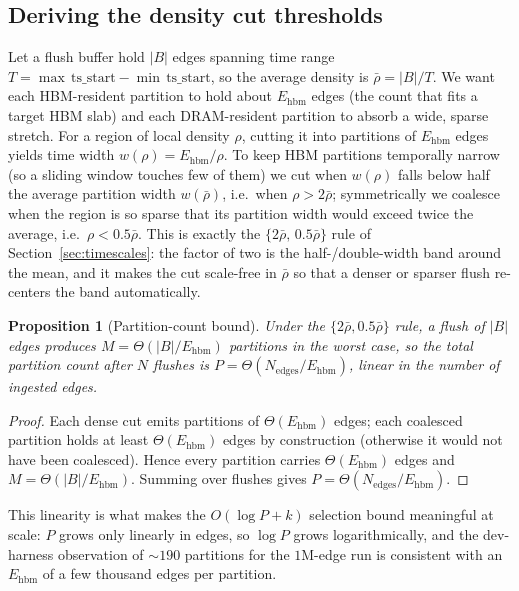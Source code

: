 \documentclass[10pt]{article}
\newtheorem{proposition}{Proposition}
\theoremstyle{definition}
\begin{document}
\subsection{Deriving the density cut thresholds}

Let a flush buffer hold $|B|$ edges spanning time range $T=\max\,\mathrm{ts\_start}-\min\,\mathrm{ts\_start}$,
so the average density is $\bar\rho=|B|/T$. We want each HBM-resident partition to hold about
$E_{\mathrm{hbm}}$ edges (the count that fits a target HBM slab) and each DRAM-resident partition to
absorb a wide, sparse stretch. For a region of local density $\rho$, cutting it into partitions of
$E_{\mathrm{hbm}}$ edges yields time width $w(\rho)=E_{\mathrm{hbm}}/\rho$. To keep HBM partitions
temporally narrow (so a sliding window touches few of them) we cut when $w(\rho)$ falls below half the
average partition width $w(\bar\rho)$, i.e.\ when $\rho>2\bar\rho$; symmetrically we coalesce when the
region is so sparse that its partition width would exceed twice the average, i.e.\ $\rho<0.5\bar\rho$.
This is exactly the $\{2\bar\rho,\,0.5\bar\rho\}$ rule of Section~\ref{sec:timescales}: the factor of
two is the half-/double-width band around the mean, and it makes the cut scale-free in $\bar\rho$ so
that a denser or sparser flush re-centers the band automatically.

\begin{proposition}[Partition-count bound]
\label{prop:pcount}
Under the $\{2\bar\rho,0.5\bar\rho\}$ rule, a flush of $|B|$ edges produces
$M=\Theta(|B|/E_{\mathrm{hbm}})$ partitions in the worst case, so the total partition count after $N$
flushes is $P=\Theta(N_{\mathrm{edges}}/E_{\mathrm{hbm}})$, linear in the number of ingested edges.
\end{proposition}
\begin{proof}
Each dense cut emits partitions of $\Theta(E_{\mathrm{hbm}})$ edges; each coalesced partition holds at
least $\Theta(E_{\mathrm{hbm}})$ edges by construction (otherwise it would not have been coalesced). Hence
every partition carries $\Theta(E_{\mathrm{hbm}})$ edges and $M=\Theta(|B|/E_{\mathrm{hbm}})$. Summing over
flushes gives $P=\Theta(N_{\mathrm{edges}}/E_{\mathrm{hbm}})$.
\end{proof}

This linearity is what makes the $O(\log P + k)$ selection bound meaningful at scale: $P$ grows only
linearly in edges, so $\log P$ grows logarithmically, and the dev-harness observation of ${\sim}190$
partitions for the $1$M-edge run is consistent with an $E_{\mathrm{hbm}}$ of a few thousand edges per
partition.
\end{document}
